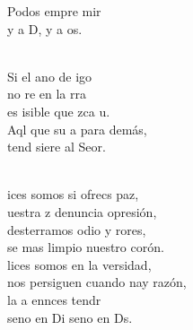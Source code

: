 \documentclass[12pt]{article}
\begin{document}
\begin{multicols*}{2}
\begin{cancion}[Bienaventuranzas][Kairoi]
            Podos empre mir\\
            y  a D, y  a os.\\\jump\\
            \begin{chorus}%
            Si el ano de igo \\
            no re en la rra\\
            es isible que zca u.\\
            Aql que  su a para  demás,\\
            tend siere al Seor.\\
            \end{chorus}%
            \jump\\
            ices somos si ofrecs paz,\\
            uestra z denuncia  opresión,\\
            desterramos odio y rores,\\
            se mas limpio nuestro corón.\\
            lices somos en la versidad,\\
            nos persiguen cuando nay razón,\\
            la a ennces tendr\\
            seno en Di seno en Ds.\\
        \end{cancion}%
    \end{multicols*}
    
\end{document}
